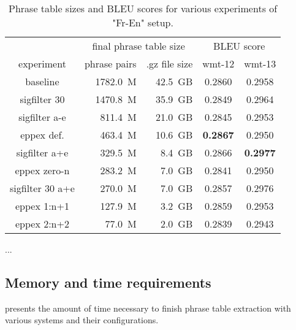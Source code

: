 \begin{table}[ht]
\centering
\begin{tabular}{ | c | r r | c c | }
\hline
 & \multicolumn{2}{|c|}{final phrase table size} & \multicolumn{2}{|c|}{BLEU score} \\
experiment & phrase pairs & .gz file size & wmt-12 & wmt-13 \\
\hline
\hline
baseline          & 1782.0~M & 42.5~GB & 0.2860 & 0.2958 \\
sigfilter 30      & 1470.8~M & 35.9~GB & 0.2849 & 0.2964 \\
sigfilter a-e     &  811.4~M & 21.0~GB & 0.2845 & 0.2953 \\
eppex def.        &  463.4~M & 10.6~GB & \textbf{0.2867} & 0.2950 \\
sigfilter a+e     &  329.5~M &  8.4~GB & 0.2866 & \textbf{0.2977} \\
eppex zero-n      &  283.2~M &  7.0~GB & 0.2841 & 0.2950 \\
sigfilter 30 a+e  &  270.0~M &  7.0~GB & 0.2857 & 0.2976 \\
eppex 1:n+1       &  127.9~M &  3.2~GB & 0.2859 & 0.2953 \\
eppex 2:n+2       &   77.0~M &  2.0~GB & 0.2839 & 0.2943 \\
\hline
\end{tabular}
\caption{\label{fr-en-pt-size-and-bleu}
Phrase table sizes and BLEU scores for various experiments of "Fr-En" setup.}
\end{table}

...

\subsection{Memory and time requirements}

 presents the amount of time necessary to finish
phrase table extraction with various systems and their configurations.

